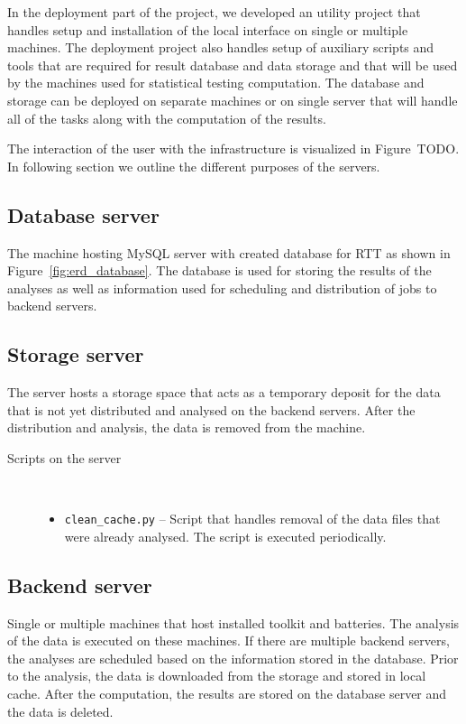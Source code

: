 \documentclass[
  digital,  	%
  color,		%
  oneside,   	%
  12pt,
  nocover,
  notable,
  nolof,
  nolot,
]{fithesis3}
\newenvironment{titlemize}[1]
{
	\begin{description}
	\item[#1]\
	\begin{itemize}
}
{
	\end{itemize}
 	\end{description}
}
\begin{document}
In the deployment part of the project, we developed an utility project that handles setup and installation of the local interface on single or multiple machines. The deployment project also handles setup of auxiliary scripts and tools that are required for result database and data storage and that will be used by the machines used for statistical testing computation. The database and storage can be deployed on separate machines or on single server that will handle all of the tasks along with the computation of the results. 

The interaction of the user with the infrastructure is visualized in Figure~TODO. In following section we outline the different purposes of the servers.

\subsection{Database server}
The machine hosting MySQL server with created database for RTT as shown in Figure~\ref{fig:erd_database}. The database is used for storing the results of the analyses as well as information used for scheduling and distribution of jobs to backend servers.

\subsection{Storage server}
The server hosts a storage space that acts as a temporary deposit for the data that is not yet distributed and analysed on the backend servers. After the distribution and analysis, the data is removed from the machine.

\begin{titlemize}{Scripts on the server}
\item \texttt{clean\_cache.py} -- Script that handles removal of the data files that were already analysed. The script is executed periodically.
\end{titlemize}

\subsection{Backend server}
Single or multiple machines that host installed toolkit and batteries. The analysis of the data is executed on these machines. If there are multiple backend servers, the analyses are scheduled based on the information stored in the database. Prior to the analysis, the data is downloaded from the storage and stored in local cache. After the computation, the results are stored on the database server and the data is deleted.
\end{document}
